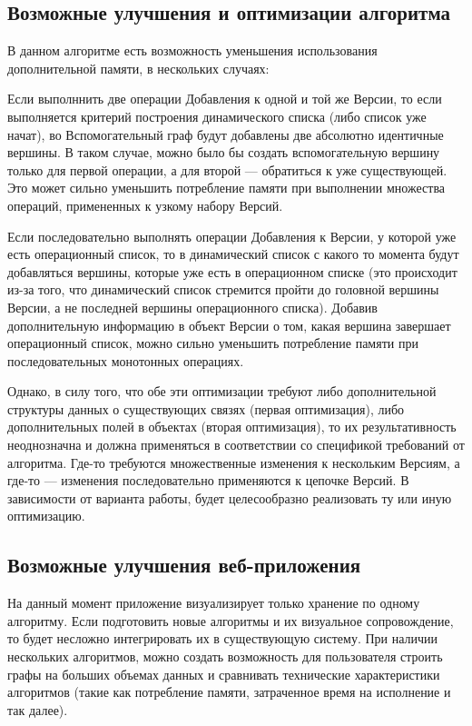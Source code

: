 \documentclass[a4paper,12pt]{extarticle}
\begin{document}
\subsection{Возможные улучшения и оптимизации алгоритма}
В данном алгоритме есть возможность уменьшения использования дополнительной памяти, в нескольких случаях:\par
Если выполннить две операции Добавления к одной и той же Версии, то если выполняется критерий построения динамического списка (либо список уже начат), во Вспомогательный граф будут добавлены две абсолютно идентичные вершины. В таком случае, можно было бы создать вспомогательную вершину только для первой операции, а для второй — обратиться к уже существующей. Это может сильно уменьшить потребление памяти при выполнении множества операций, примененных к узкому набору Версий.\par
Если последовательно выполнять операции Добавления к Версии, у которой уже есть операционный список, то в динамический список с какого то момента будут добавляться вершины, которые уже есть в операционном списке (это происходит из-за того, что динамический список стремится пройти до головной вершины Версии, а не последней вершины операционного списка). Добавив дополнительную информацию в объект Версии о том, какая вершина завершает операционный список, можно сильно уменьшить потребление памяти при последовательных монотонных операциях.\par
Однако, в силу того, что обе эти оптимизации требуют либо дополнительной структуры данных о существующих связях (первая оптимизация), либо дополнительных полей в объектах (вторая оптимизация), то их результативность неоднозначна и должна применяться в соответствии со спецификой требований от алгоритма. Где-то требуются множественные изменения к нескольким Версиям, а где-то — изменения последовательно применяются к цепочке Версий. В зависимости от варианта работы, будет целесообразно реализовать ту или иную оптимизацию.

\subsection{Возможные улучшения веб-приложения}
На данный момент приложение визуализирует только хранение по одному алгоритму. Если подготовить новые алгоритмы и их визуальное сопровождение, то будет несложно интегрировать их в существующую систему. При наличии нескольких алгоритмов, можно создать возможность для пользователя строить графы на больших объемах данных и сравнивать технические характеристики алгоритмов (такие как потребление памяти, затраченное время на исполнение и так далее).\\

\newpage 
\printbibliography[heading=bibintoc]
\end{document}
